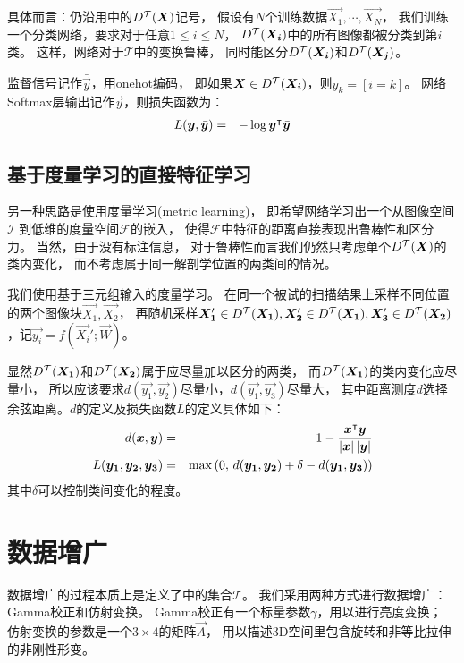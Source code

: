 具体而言：仍沿用中的$D^{\mathcal{T}}(\boldsymbol{X})$记号，
假设有$N$个训练数据$\vec{X_1},\cdots,\vec{X_N}$，
我们训练一个分类网络，要求对于任意$1\le i \le N$，
$D^{\mathcal{T}}(\boldsymbol{X_i})$中的所有图像都被分类到第$i$类。
这样，网络对于$\mathcal{T}$中的变换鲁棒，
同时能区分$D^{\mathcal{T}}(\boldsymbol{X_i})$和$D^{\mathcal{T}}(\boldsymbol{X_j})$。

监督信号记作$\bar{\vec{y}}$，用onehot编码，
即如果$\boldsymbol{X}\in D^{\mathcal{T}}(\boldsymbol{X_i})$，则$\bar{y_k}=[i=k]$。
网络Softmax层输出记作$\vec{y}$，则损失函数为：
\begin{eqnarray}
    L(\boldsymbol{y}, \bar{\boldsymbol{y}}) &=& -\log \boldsymbol{y}^\intercal\bar{\boldsymbol{y}}
\end{eqnarray}

\subsection{基于度量学习的直接特征学习\label{sec:cnn:loss:mtrc}}
另一种思路是使用度量学习(metric learning)，
即希望网络学习出一个从图像空间$\mathcal{I}$
到低维的度量空间$\mathcal{F}$的嵌入，
使得$\mathcal{F}$中特征的距离直接表现出鲁棒性和区分力。
当然，由于没有标注信息，
对于鲁棒性而言我们仍然只考虑单个$D^{\mathcal{T}}(\boldsymbol{X})$的类内变化，
而不考虑属于同一解剖学位置的两类间的情况。

我们使用基于三元组输入的度量学习。
在同一个被试的扫描结果上采样不同位置的两个图像块$\vec{X_1}, \vec{X_2}$，
再随机采样$\boldsymbol{X_1}' \in D^{\mathcal{T}}(\boldsymbol{X_1}), \boldsymbol{X_2}' \in D^{\mathcal{T}}(\boldsymbol{X_1}),
\boldsymbol{X_3}' \in D^{\mathcal{T}}(\boldsymbol{X_2})$，记$\vec{y_i}=f(\vec{X_i}';\vec{W})$。

显然$D^{\mathcal{T}}(\boldsymbol{X_1})$和$D^{\mathcal{T}}(\boldsymbol{X_2})$属于应尽量加以区分的两类，
而$D^{\mathcal{T}}(\boldsymbol{X_1})$的类内变化应尽量小，
所以应该要求$d(\vec{y_1},\vec{y_2})$尽量小，$d(\vec{y_1}, \vec{y_3})$尽量大，
其中距离测度$d$选择余弦距离。$d$的定义及损失函数$L$的定义具体如下：
\begin{eqnarray}
    d(\boldsymbol{x}, \boldsymbol{y}) &=& 1 -
        \frac{\boldsymbol{x}^\intercal\boldsymbol{y}}{\left|\boldsymbol{x}\right|\left|\boldsymbol{y}\right|} \nonumber \\
    L(\boldsymbol{y_1}, \boldsymbol{y_2}, \boldsymbol{y_3}) &=&
        \max\left(0,\, d(\boldsymbol{y_1}, \boldsymbol{y_2}) + \delta - d(\boldsymbol{y_1}, \boldsymbol{y_3})
        \right)
    \label{eqn:cnn:mtrc:loss}
\end{eqnarray}
其中$\delta$可以控制类间变化的程度。

\section{数据增广\label{sec:cnn:aug}}
数据增广的过程本质上是定义了中的集合$\mathcal{T}$。
我们采用两种方式进行数据增广：Gamma校正和仿射变换。
Gamma校正有一个标量参数$\gamma$，用以进行亮度变换；
仿射变换的参数是一个$3\times 4$的矩阵$\vec{A}$，
用以描述3D空间里包含旋转和非等比拉伸的非刚性形变。


